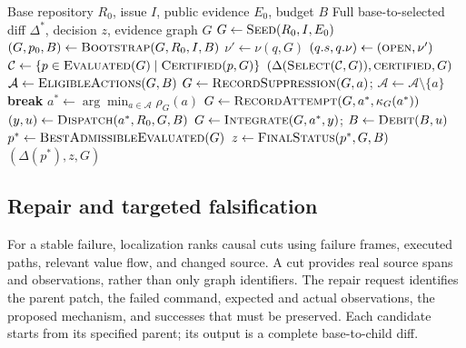 \documentclass[acmsmall,screen,review,anonymous]{acmart}
\newcommand{\open}{\textsc{open}}
\begin{document}
\begin{algorithm}[t]
\caption{Evidence-dependent repair and falsification}
\label{alg:scheduler}
\begin{algorithmic}[1]
\Require Base repository $R_0$, issue $I$, public evidence $E_0$, budget $B$
\Ensure Full base-to-selected diff $\Delta^*$, decision $z$, evidence graph $G$
\State $G \gets \Call{Seed}{R_0,I,E_0}$
\State $(G,p_0,B) \gets \Call{Bootstrap}{G,R_0,I,B}$
    \State $\nu' \gets \nu(q,G)$ 
      \State $(q.s,q.\nu)\gets(\open,\nu')$
    \EndIf
  \EndFor
  \State $\mathcal{C}\gets\{p\in\Call{Evaluated}{G}\mid\Call{Certified}{p,G}\}$
    \State \Return $(\Delta(\Call{Select}{\mathcal{C},G}),\textsc{certified},G)$
  \EndIf
  \State $\mathcal{A}\gets\Call{EligibleActions}{G,B}$
      \State $G\gets\Call{RecordSuppression}{G,a}$; $\mathcal{A}\gets\mathcal{A}\setminus\{a\}$
    \EndIf
  \EndFor
    \State \textbf{break} 
  \EndIf
  \State $a^*\gets\arg\min_{a\in\mathcal{A}}\rho_G(a)$ 
  \State $G\gets\Call{RecordAttempt}{G,a^*,\kappa_G(a^*)}$
  \State $(y,u)\gets\Call{Dispatch}{a^*,R_0,G,B}$
  \State $G\gets\Call{Integrate}{G,a^*,y}$; $B\gets\Call{Debit}{B,u}$
\EndWhile
\State $p^*\gets\Call{BestAdmissibleEvaluated}{G}$
\State $z\gets\Call{FinalStatus}{p^*,G,B}$
\State \Return $(\Delta(p^*),z,G)$
\end{algorithmic}
\end{algorithm}

\subsection{Repair and targeted falsification}
For a stable failure, localization ranks causal cuts using failure frames, executed paths, relevant value flow, and changed source. A cut provides real source spans and observations, rather than only graph identifiers. The repair request identifies the parent patch, the failed command, expected and actual observations, the proposed mechanism, and successes that must be preserved. Each candidate starts from its specified parent; its output is a complete base-to-child diff.
\end{document}
